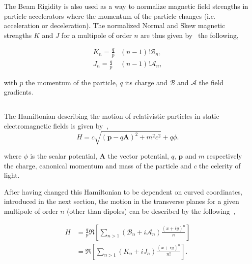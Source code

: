 The Beam Rigidity is also used as a way to normalize magnetic field strengths in particle
accelerators where the momentum of the particle changes (i.e. acceleration or deceleration).
The normalized Normal and Skew magnetic strengths $K$ and $J$ for a multipole of order $n$ are thus
given by~\cite{wolf_engineering_2001} the following,

\begin{equation}
    \begin{aligned}
        K_n =  \frac{q}{p} &(n-1)! \mathcal{B}_n, \\ 
        J_n =  \frac{q}{p} &(n-1)! \mathcal{A}_n,
    \end{aligned}
    \label{eq:magnetic_fields_normalized}
\end{equation}

with $p$ the momentum of the particle, $q$ its charge and $\mathcal{B}$ and $\mathcal{A}$ the field
gradients.


\subsection{}

The Hamiltonian describing the motion of relativistic particles in static electromagnetic fields is
given by~\cite{wolski_beam_2014},
\begin{equation}
    H = c \sqrt{(\mathbf{p}-q\mathbf{A})^2 + m^2c^2} + q\phi.
\end{equation}

where $\phi$ is the scalar potential, $\mathbf{A}$ the vector potential, $q$, $\mathbf{p}$ and $m$
respectively the charge, canonical momentum and mass of the particle and $c$ the celerity of light.

After having changed this Hamiltonian to be dependent on curved coordinates, introduced in the next
section, the motion in the transverse planes for a given multipole of order $n$ (other than dipoles)
can be described by the following~\cite{wolski_beam_2014},

\begin{equation}
    \begin{aligned}
        H &= \frac{q}{p} \Re \left[ \sum_{n>1} (\mathcal{B}_n + i\mathcal{A}_n) \frac{(x+iy)^n}{n} \right] \\
          &= \Re \left[ \sum_{n>1} (K_n + iJ_n) \frac{(x+iy)^n}{n!} \right].
    \end{aligned}
    \label{eq:hamiltonian_magnet}
\end{equation}

